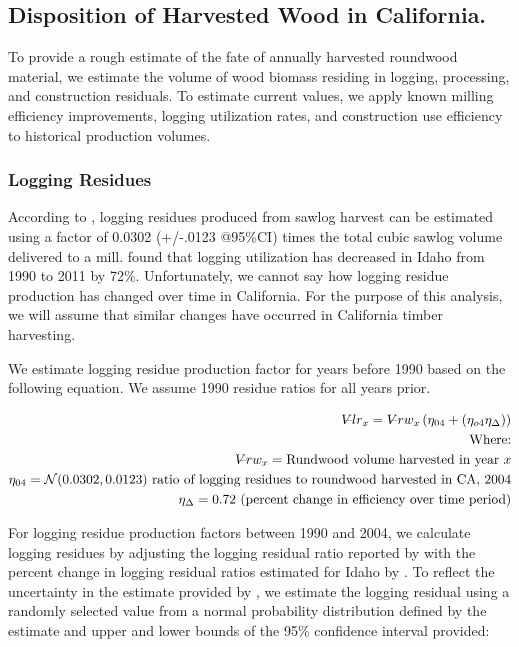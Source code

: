 \documentclass[a4paper]{article}
\begin{document}
\subsection{Disposition of Harvested Wood in California.}
\label{sec:orgheadline15}
To provide a rough estimate of the fate of annually harvested roundwood material, we estimate the volume of wood biomass residing in logging, processing, and construction residuals. To estimate current values, we apply known milling efficiency improvements, logging utilization rates, and construction use efficiency to historical production volumes. 
\subsubsection{Logging Residues}
\label{sec:orgheadline10}
According to \citet{Morgan}, logging residues produced from sawlog harvest can be estimated using a factor of 0.0302 (+/-.0123 @95\%CI) times the total cubic sawlog volume delivered to a mill. \citet{Simmons2014} found that logging utilization has decreased in Idaho from 1990 to 2011 by 72\%. Unfortunately, we cannot say how logging residue production has changed over time in California. For the purpose of this analysis, we will assume that similar changes have occurred in California timber harvesting. 

We estimate logging residue production factor for years before 1990 based on the following equation. We assume 1990 residue ratios for all years prior.


\begin{align*}
V\llap{--}lr_{x} = V\llap{--}rw_{x}\left(\eta_{04}+\left(\eta_{o4}\eta_\Delta\right)\right)\\
\text{Where:}\\
V\llap{--}rw_{x} = \text{Rundwood volume harvested in year }x\\
\eta_{04} = \mathcal{N}(0.0302,0.0123) \text{ ratio of logging residues to roundwood harvested in CA, 2004}\\
\eta_\Delta = 0.72 \text{ (percent change in efficiency over time period)}\\
\end{align*}

For logging residue production factors between 1990 and 2004, we calculate logging residues by adjusting the logging residual ratio reported by \citet{Morgan} with the percent change in logging residual ratios estimated for Idaho by \citet{Simmons2014}. To reflect the uncertainty in the estimate provided by \citet{Morgan}, we estimate the logging residual using a randomly selected value from a normal probability distribution defined by the estimate and upper and lower bounds of the 95\% confidence interval provided:
\end{document}
